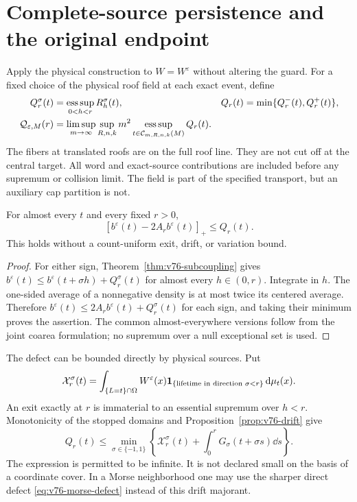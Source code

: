 \section{Complete-source persistence and the original endpoint}
\label{sec:v76-persistence}
Apply the physical construction to $W=W^\varepsilon$ without
altering the guard. For a fixed choice of the physical roof field
at each exact event, define
\begin{align}
 Q_r^\sigma(t)&=\operatorname*{ess\,sup}_{0<h<r}R_h^\sigma(t),
 &Q_r(t)&=\min\{Q_r^-(t),Q_r^+(t)\},\label{eq:v76-Q}\\
 \mathcal Q_{\varepsilon,M}(r)&=
 \limsup_{m\to\infty}\sup_{R,n,k}m^2
                 \esssup_{t\in\mathcal C_{m,R,n,k}(M)}Q_r(t).
 \label{eq:v76-ordered-Q}
\end{align}
The fibers at translated roofs are on the full roof line. They are
not cut off at the central target. All word and exact-source
contributions are included before any supremum or collision limit.
The field is part of the specified transport, but an auxiliary cap
partition is not.

\begin{theorem}
\label{thm:v76-persistence}
For almost every $t$ and every fixed $r>0$,
\begin{equation}\label{eq:v76-persistence}
       [b^\varepsilon(t)-2A_r b^\varepsilon(t)]_+\le Q_r(t).
\end{equation}
This holds without a count-uniform exit, drift, or variation bound.
\end{theorem}
\begin{proof}
For either sign, Theorem~\ref{thm:v76-subcoupling} gives
$b^\varepsilon(t)\le b^\varepsilon(t+\sigma h)+Q_r^\sigma(t)$
for almost every $h\in(0,r)$. Integrate in $h$. The one-sided
average of a nonnegative density is at most twice its centered
average. Therefore
$b^\varepsilon(t)\le2A_r b^\varepsilon(t)+Q_r^\sigma(t)$
for each sign, and taking their minimum proves the assertion.
The common almost-everywhere versions follow from the joint
coarea formulation; no supremum over a null exceptional set is used.
\end{proof}

The defect can be bounded directly by physical sources. Put
\[
 \mathcal X_r^\sigma(t)=\int_{\{L=t\}\cap\Omega}
 W^\varepsilon(x)\mathbf1_{\{\text{lifetime in direction }\sigma<r\}}
                                      \,\mathrm d\mu_t(x).
\]
An exit exactly at $r$ is immaterial to an essential supremum over
$h<r$. Monotonicity of the stopped domains and
Proposition~\ref{prop:v76-drift} give
\begin{equation}\label{eq:v76-physical-budget}
 Q_r(t)\le\min_{\sigma\in\{-1,1\}}
 \left\{\mathcal X_r^\sigma(t)
            +\int_0^rG_\sigma(t+\sigma s)\dd s\right\}.
\end{equation}
The expression is permitted to be infinite. It is not declared
small on the basis of a coordinate cover. In a Morse neighborhood
one may use the sharper direct defect \eqref{eq:v76-morse-defect}
instead of this drift majorant.

